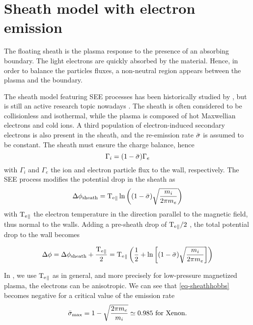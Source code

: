
\section{Sheath model with electron emission}
  \label{sec-sheath}
    
  The floating sheath is the plasma response to the presence of an absorbing boundary.
  The light electrons are quickly absorbed by the material.
  Hence, in order to balance the particles fluxes, a non-neutral region appears between the plasma and the boundary.
  
  
  The sheath model featuring SEE processes has been historically studied by \citet{hobbs1967}, but is still an active research topic nowadays \citep{ahedo2005}.
  The sheath is often considered to be collisionless and isothermal, while the plasma is composed of hot Maxwellian electrons and cold ions. A third population of electron-induced secondary electrons is also present in the sheath, and the re-emission rate $ \bar{\sigma }$ is assumed to be constant.
  The sheath must ensure the charge balance, hence
  \begin{equation} \label{eq-sheath_SEE}
    \Gamma_i = ( 1 -  \bar{\sigma }) \Gamma_e
  \end{equation}
  with $\Gamma_i$ and $\Gamma_e$ the ion and electron particle flux to the wall, respectively.
  The SEE process modifies the potential drop in the sheath as \citep{hobbs1967}
  \begin{equation} \label{eq-sheathhobbs}
    \Delta \phi_{\rm sheath} = \mathrm{T_e}_{\parallel} \ln \left( (1 -  \bar{\sigma }) \sqrt{\frac{m_i}{2 \pi m_e}}   \right)
  \end{equation}
  with $\mathrm{T_e}_{\parallel}$ the electron temperature in the direction parallel to the magnetic field, thus normal to the walls.
  Adding a pre-sheath drop of $\mathrm{T_e}_{\parallel}/2$ \citep{ahedo2002}, the total potential drop to the wall becomes
  
  \begin{equation} \label{eq-total_drop}
    \Delta \phi = \Delta \phi_{\rm sheath} + \frac{\mathrm{T_e}_{\parallel}}{2} =  \mathrm{T_e}_{\parallel} \left( \frac{1}{2} + \ln \left[ (1 -  \bar{\sigma }) \sqrt{\frac{m_i}{2 \pi m_e}}   \right]  \right)
  \end{equation}
  
  In , we use $\mathrm{T_e}_{\parallel}$ as in general, and more precisely for low-pressure magnetized plasma, the electrons can be anisotropic.
  We can see that \cref{eq-sheathhobbs} becomes negative for a critical value of the emission rate
  \begin{equation} \label{eq-ratecrone}
     \bar{\sigma }_{\rm max} = 1 - \sqrt{\frac{2 \pi m_e}{m_i}} \simeq 0.985 \text{ for Xenon.}
  \end{equation}
  
